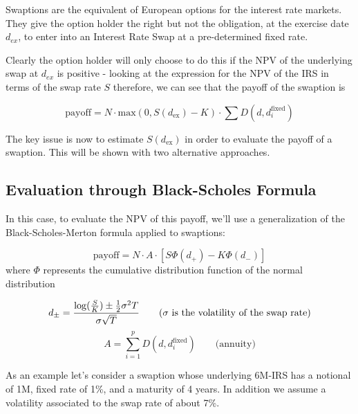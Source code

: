 Swaptions are the equivalent of European options for the interest rate
markets. They give the option holder the right but not the obligation,
at the exercise date \(d_{ex}\), to enter into an Interest Rate Swap at
a pre-determined fixed rate.

Clearly the option holder will only choose to do this if the NPV of the
underlying swap at \(d_{ex}\) is positive - looking at the expression
for the NPV of the IRS in terms of the swap rate \(S\) therefore, we can
see that the payoff of the swaption is

\[\mathrm{payoff} = N\cdot \mathrm{max}(0, S(d_{\mathrm{ex}}) - K)\cdot\sum D(d, d_i^{\mathrm{fixed}})\]

The key issue is now to estimate \(S(d_{\mathrm{ex}})\) in order to
evaluate the payoff of a swaption. This will be shown with two
alternative approaches.

\subsection{Evaluation through Black-Scholes Formula}\label{evaluation-through-black-scholes-formula}

In this case, to evaluate the NPV of this payoff, we'll use a
generalization of the Black-Scholes-Merton formula applied to swaptions:

\[\mathrm{payoff} = N\cdot A\cdot [S \Phi(d_+) - K\Phi(d_-)]\]
where \(\Phi\) represents the cumulative distribution function of the normal distribution

\[d_{\pm} = \frac{\mathrm{log}(\frac{S}{K}) \pm \frac{1}{2}\sigma^{2}T}{\sigma\sqrt{T}}\qquad(\sigma~\textrm{is the volatility of the swap rate})\\\]
\[A =\sum_{i=1}^{p}D(d, d_{i}^{\mathrm{fixed}})\qquad\mathrm{(annuity})\]

As an example let's consider a swaption whose underlying 6M-IRS has a
notional of 1M, fixed rate of 1\%, and a maturity of 4 years. In
addition we assume a volatility associated to the swap rate of about
7\%.

